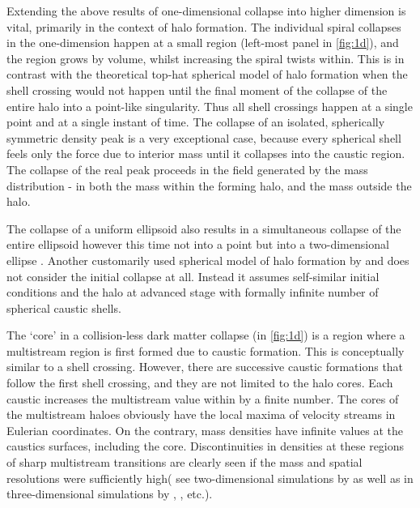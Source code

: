 \documentclass[fleqn,usenatbib,useAMS]{mnras}
\begin{document}
Extending the above results of one-dimensional collapse into higher dimension is vital, primarily in the context of halo formation. The individual spiral collapses in the one-dimension happen at a small region (left-most panel in \autoref{fig:1d}), and the region grows by volume, whilst increasing the spiral twists within. This is in contrast with the theoretical top-hat spherical model of halo formation when the shell crossing would not happen until the final moment of the collapse of the entire halo into a point-like singularity. Thus all shell crossings happen at a single point
and at a single instant of time. The collapse of an isolated, spherically symmetric density peak is a very exceptional case, because every spherical shell feels only the force due to interior mass until it collapses into the caustic region. The collapse of the real peak proceeds in the field generated by the mass distribution - in both the mass within the forming halo, and the mass outside the halo. 

The collapse of a uniform ellipsoid also results in a simultaneous collapse of the entire ellipsoid
however this time not into a point but into a two-dimensional ellipse \citep{Lin1965}.%
Another customarily used spherical model of halo formation by \cite{Fillmore1984} and \cite{Bertschinger1985} does not consider
the initial collapse at all. Instead it assumes self-similar initial conditions and the halo at advanced stage with formally infinite number of spherical caustic shells.

The `core' in a collision-less dark matter collapse (in \autoref{fig:1d}) is a region where a multistream region is first formed due to caustic formation. This is conceptually similar to a shell crossing. However, there are successive caustic formations that follow the first shell crossing, and they are not limited to the halo cores. Each caustic increases the multistream value within by a finite number. The cores of the multistream haloes obviously have the local maxima of velocity streams in Eulerian coordinates. On the contrary, mass densities have infinite values at the caustics surfaces, including the core. Discontinuities in densities at these regions of sharp multistream transitions are clearly seen if the mass and spatial resolutions were sufficiently high( see two-dimensional simulations by \citealt{Melott1989} as well as in three-dimensional simulations by \citealt{Hahn2013}, \citealt{Angulo2016}, \citealt{Hahn2016a} etc.). 
\end{document}
